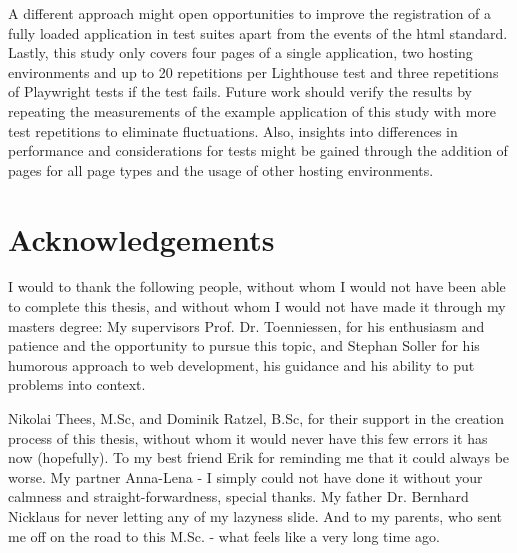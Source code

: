 \documentclass[a4paper, 12pt]{article}
\makeatletter
\renewcommand\lstlistoflistings{
  \section{\lstlistlistingname}
  \@starttoc{lol}%
}
\makeatother
\begin{document}
A different approach might open opportunities to improve the registration of a fully loaded application in test suites apart from the events of the \acrshort{html} standard.
Lastly, this study only covers four pages of a single application, two hosting environments and up to 20 repetitions per Lighthouse test and three repetitions of Playwright tests if the test fails.
Future work should verify the results by repeating the measurements of the example application of this study with more test repetitions to eliminate fluctuations.
Also, insights into differences in performance and considerations for tests might be gained through the addition of pages for all page types and the usage of other hosting environments. 

\pagebreak

\appendix

\section{Acknowledgements}

I would to thank the following people, without whom I would not have been able to complete this thesis, and without whom I would not have made it through my masters degree:
My supervisors Prof. Dr. Toenniessen, for his enthusiasm and patience and the opportunity to pursue this topic, and Stephan Soller for his humorous approach to web development, his guidance and his ability to put problems into context.

Nikolai Thees, M.Sc, and Dominik Ratzel, B.Sc, for their support in the creation process of this thesis, without whom it would never have this few errors it has now (hopefully).
To my best friend Erik for reminding me that it could always be worse.
My partner Anna-Lena - I simply could not have done it without your calmness and straight-forwardness, special thanks.
My father Dr. Bernhard Nicklaus for never letting any of my lazyness slide.
And to my parents, who sent me off on the road to this M.Sc. - what feels like a very long time ago.

\lstlistoflistings

\pagebreak

\end{document}

